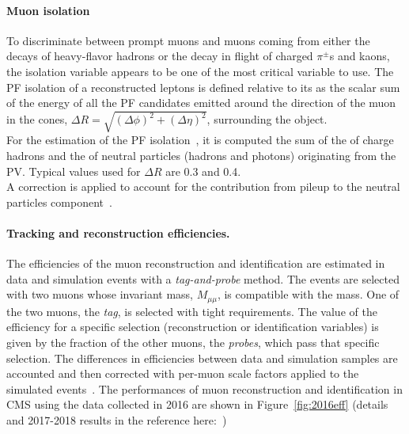 \paragraph{Muon isolation}\label{sec:muoniso}
To discriminate between prompt muons and muons coming from either the decays
of heavy-flavor hadrons or the decay in flight of charged $\pi^{\pm}$s and kaons, the isolation variable appears to be one of
the most critical variable to use. The PF isolation of a reconstructed
leptons is defined relative to its \pt as the scalar
sum of the energy of all the PF candidates emitted around the
direction of the muon in the cones, $\Delta R = \sqrt{(\Delta
  \phi)^2+(\Delta \eta)^2}$, surrounding the object.\\
For the estimation of the PF isolation~\cite{CMS:particleflow}, it is computed the sum of the
\pt of charge hadrons and the \pt of neutral particles (hadrons
and photons) originating from the PV. Typical values used for  $\Delta
R$ are 0.3 and 0.4.\\
A correction is applied to account for the contribution from pileup to the
neutral particles component~\cite{Sirunyan_2018_muon}.

\paragraph{Tracking and reconstruction efficiencies.}\label{sec:c2effmuon}
The efficiencies of the muon reconstruction and identification are
estimated in data and simulation events with a \emph{tag-and-probe}
method. The events are selected with two muons whose invariant mass,
$M_{\mu \mu}$, is compatible with the \PZ mass. One of the two muons,
the \emph{tag}, is selected with tight requirements. The value of the
efficiency for a specific selection (reconstruction or identification
variables) is given by the fraction of the other muons, the
\emph{probes}, which pass that specific selection. The differences in
efficiencies between data and simulation samples are accounted and
then corrected with per-muon scale factors applied to the simulated
events~\cite{Sirunyan_2018_muon}. The performances of muon
reconstruction and identification in CMS using the data collected in
2016 are shown in Figure~\ref{fig:2016eff} (details and 2017-2018
results in the reference here:~\cite{CMS-DP-2017-007,CMS-DP-2018-042})

